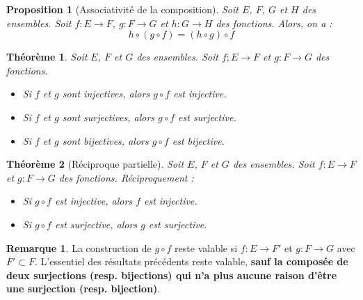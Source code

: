 \documentclass[french]{book}
\theoremstyle{plain}
\newtheorem{thm}{Théorème}[chapter]
\newtheorem{prop}{Proposition}[chapter]
\theoremstyle{definition}
\newtheorem{rmq}{Remarque}[chapter]
\theoremstyle{remark}
\begin{document}
\begin{prop}[Associativité de la composition]
	Soit $E$, $F$, $G$ et $H$ des ensembles. Soit $f:E\rightarrow F$, $g:F\rightarrow G$ et $h:G\rightarrow H$ des fonctions. Alors, on a : $$h\circ(g\circ f)=(h\circ g)\circ f$$
\end{prop}
\begin{thm}
	Soit $E$, $F$ et $G$ des ensembles. Soit $f;E\rightarrow F$ et $g:F\rightarrow G$ des fonctions.
	\begin{itemize}
		\item Si $f$ et $g$ sont injectives, alors $g\circ f$ est injective.
		\item Si $f$ et $g$ sont surjectives, alors $g\circ f$ est surjective.
		\item Si $f$ et $g$ sont bijectives, alors $g\circ f$ est bijective.
	\end{itemize}
\end{thm}
\begin{thm}[Réciproque partielle]
	Soit $E$, $F$ et $G$ des ensembles. Soit $f:E\rightarrow F$ et $g:F\rightarrow G$ des fonctions. Réciproquement :
	\begin{itemize}
		\item Si $g\circ f$ est injective, alors $f$ est injective.
		\item Si $g\circ f$ est surjective, alors $g$ est surjective.
	\end{itemize}
\end{thm}
\begin{rmq}
	La construction de $g\circ f$ reste valable si $f:E\rightarrow F'$ et $g:F\rightarrow G$ avec $F'\subset F$. L'essentiel des résultats précédents reste valable, \textbf{sauf la composée de deux surjections (resp. bijections) qui n'a plus aucune raison d'être une surjection (resp. bijection)}.
\end{rmq}
\end{document}
